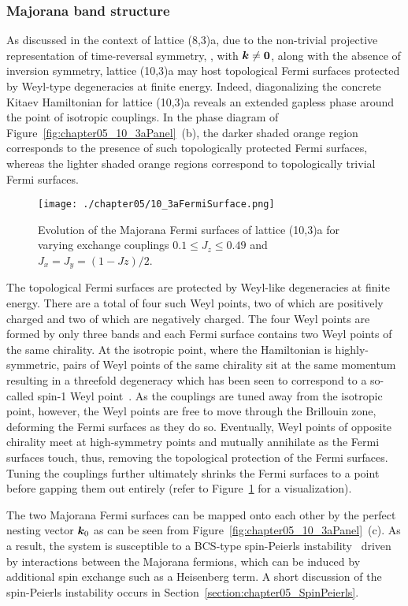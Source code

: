 \subsubsection{Majorana band structure}
%
%
As discussed in the context of lattice (8,3)a, due to the non-trivial projective representation of time-reversal symmetry, \ie, with $\bm{k} \neq \bm{0}$, along with the absence of inversion symmetry, lattice (10,3)a may host topological Fermi surfaces protected by Weyl-type degeneracies at finite energy.
Indeed, diagonalizing the concrete Kitaev Hamiltonian for lattice (10,3)a reveals an extended gapless phase around the point of isotropic couplings.
In the phase diagram of Figure~\ref{fig:chapter05_10_3aPanel}~(b), the darker shaded orange region corresponds to the presence of such topologically protected Fermi surfaces, whereas the lighter shaded orange regions correspond to topologically trivial Fermi surfaces.
%
\begin{figure}[tb]
	\centering
	\texttt{[image: ./chapter05/10\_3aFermiSurface.png]}
	\caption{
		Evolution of the Majorana Fermi surfaces of lattice (10,3)a for varying exchange couplings $0.1 \leq J_z \leq 0.49$ and $J_x = J_y = (1 - Jz)/2$.
	}
	\label{fig:chapter05_10_3aFermiSurfaces}
\end{figure}
%

The topological Fermi surfaces are protected by Weyl-like degeneracies at finite energy.
There are a total of four such Weyl points, two of which are positively charged and two of which are negatively charged.
The four Weyl points are formed by only three bands and each Fermi surface contains two Weyl points of the same chirality.
At the isotropic point, where the Hamiltonian is highly-symmetric, pairs of Weyl points of the same chirality sit at the same momentum resulting in a threefold degeneracy which has been seen to correspond to a so-called spin-1 Weyl point~\cite{WawrzikPRB2018}.
As the couplings are tuned away from the isotropic point, however, the Weyl points are free to move through the Brillouin zone, deforming the Fermi surfaces as they do so.
Eventually, Weyl points of opposite chirality meet at high-symmetry points and mutually annihilate as the Fermi surfaces touch, thus, removing the topological protection of the Fermi surfaces.
Tuning the couplings further ultimately shrinks the Fermi surfaces to a point before gapping them out entirely (refer to Figure~\ref{fig:chapter05_10_3aFermiSurfaces} for a visualization).

The two Majorana Fermi surfaces can be mapped onto each other by the perfect nesting vector $\bm{k}_0$ as can be seen from Figure~\ref{fig:chapter05_10_3aPanel}~(c).
As a result, the system is susceptible to a BCS-type spin-Peierls instability~\cite{HermannsPRL2015b} driven by interactions between the Majorana fermions, which can be induced by additional spin exchange such as a Heisenberg term.
A short discussion of the spin-Peierls instability occurs in Section~\ref{section:chapter05_SpinPeierls}.

